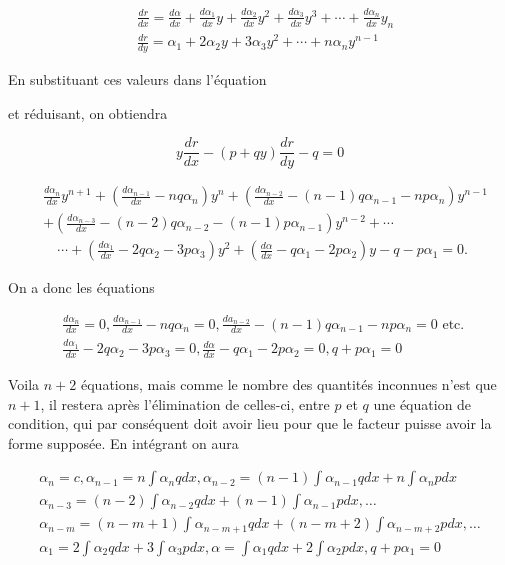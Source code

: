 \documentclass{article}
\begin{document}
\[
\begin{aligned}
& \frac{d r}{d x}=\frac{d \alpha}{d x}+\frac{d \alpha_{1}}{d x} y+\frac{d \alpha_{2}}{d x} y^{2}+\frac{d \alpha_{3}}{d x} y^{3}+\cdots+\frac{d \alpha_{n}}{d x} y_{n} \\
& \frac{d r}{d y}=\alpha_{1}+2 \alpha_{2} y+3 \alpha_{3} y^{2}+\cdots+n \alpha_{n} y^{n-1}
\end{aligned}
\]

En substituant ces valeurs dans l'équation

et réduisant, on obtiendra

\[
y \frac{d r}{d x}-(p+q y) \frac{d r}{d y}-q=0
\]

\[
\begin{aligned}
& \frac{d \alpha_{n}}{d x} y^{n+1}+\left(\frac{d \alpha_{n-1}}{d x}-n q \alpha_{n}\right) y^{n}+\left(\frac{d \alpha_{n-2}}{d x}-(n-1) q \alpha_{n-1}-n p \alpha_{n}\right) y^{n-1} \\
& +\left(\frac{d \alpha_{n-3}}{d x}-(n-2) q \alpha_{n-2}-(n-1) p \alpha_{n-1}\right) y^{n-2}+\cdots \\
& \quad \cdots+\left(\frac{d \alpha_{1}}{d x}-2 q \alpha_{2}-3 p \alpha_{3}\right) y^{2}+\left(\frac{d \alpha}{d x}-q \alpha_{1}-2 p \alpha_{2}\right) y-q-p \alpha_{1}=0 .
\end{aligned}
\]

On a donc les équations

\[
\begin{aligned}
& \frac{d \alpha_{n}}{d x}=0, \frac{d \alpha_{n-1}}{d x}-n q \alpha_{n}=0, \frac{d a_{n-2}}{d x}-(n-1) q \alpha_{n-1}-n p \alpha_{n}=0 \text { etc. } \\
& \frac{d \alpha_{1}}{d x}-2 q \alpha_{2}-3 p \alpha_{3}=0, \frac{d \alpha}{d x}-q \alpha_{1}-2 p \alpha_{2}=0, q+p \alpha_{1}=0
\end{aligned}
\]

Voila \(n+2\) équations, mais comme le nombre des quantités inconnues n'est que \(n+1\), il restera après l'élimination de celles-ci, entre \(p\) et \(q\) une équation de condition, qui par conséquent doit avoir lieu pour que le facteur puisse avoir la forme supposée. En intégrant on aura

\[
\begin{gathered}
\alpha_{n}=c, \alpha_{n-1}=n \int \alpha_{n} q d x, \alpha_{n-2}=(n-1) \int \alpha_{n-1} q d x+n \int \alpha_{n} p d x \\
\alpha_{n-3}=(n-2) \int \alpha_{n-2} q d x+(n-1) \int \alpha_{n-1} p d x, \ldots \\
\alpha_{n-m}=(n-m+1) \int \alpha_{n-m+1} q d x+(n-m+2) \int \alpha_{n-m+2} p d x, \ldots \\
\alpha_{1}=2 \int \alpha_{2} q d x+3 \int \alpha_{3} p d x, \alpha=\int \alpha_{1} q d x+2 \int \alpha_{2} p d x, q+p \alpha_{1}=0
\end{gathered}
\]
\end{document}
